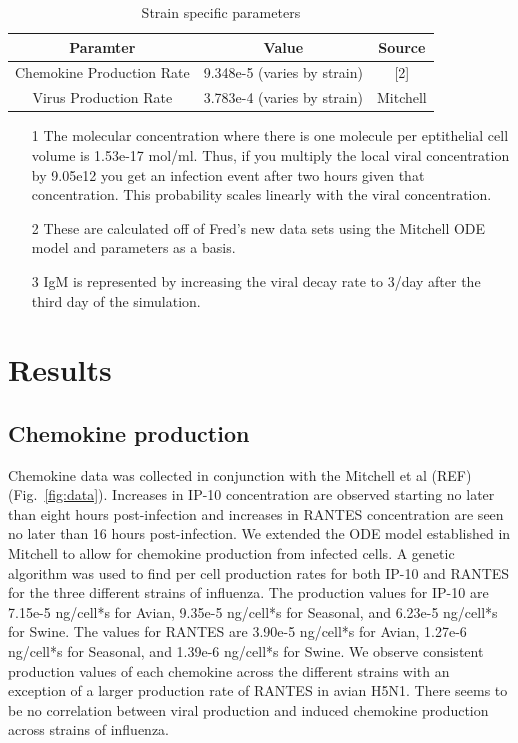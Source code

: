 \documentclass[10pt]{article}
\begin{document}
\begin{table}
\begin{tabular}{ | c | c | c | }
  \hline                        
  Paramter & Value & Source \\
  \hline
  Chemokine Production Rate &  9.348e-5 (varies by strain) & [2] \\
  Virus Production Rate &  3.783e-4 (varies by strain) & Mitchell \\
  \hline  
\end{tabular}
\caption{Strain specific parameters}
\label{table:strains}
\end{table}

\begin{itemize}
\item[1] The molecular concentration where there is one molecule per eptithelial cell volume is 1.53e-17 mol/ml.  Thus, if you multiply the local viral concentration by 9.05e12 you get an infection event after two hours given that concentration.  This probability scales linearly with the viral concentration.
\item[2] These are calculated off of Fred's new data sets using the Mitchell ODE model and parameters as a basis.
\item[3] IgM is represented by increasing the viral decay rate to 3/day after the third day of the simulation.
\end{itemize}


\section*{Results}

\subsection*{Chemokine production}

Chemokine data was collected in conjunction with the Mitchell et al (REF) (Fig.~\ref{fig:data}).   Increases in IP-10 concentration are observed starting no later than eight hours post-infection and increases in RANTES concentration are seen no later than 16 hours post-infection.  We extended the ODE model established in Mitchell to allow for chemokine production from infected cells.  A genetic algorithm was used to find per cell production rates for both IP-10 and RANTES for the three different strains of influenza.  The production values for IP-10 are 7.15e-5 ng/cell*s for Avian, 9.35e-5 ng/cell*s for Seasonal, and 6.23e-5 ng/cell*s for Swine.  The values for RANTES are 3.90e-5 ng/cell*s for Avian, 1.27e-6 ng/cell*s for Seasonal, and 1.39e-6 ng/cell*s for Swine.  We observe consistent production values of each chemokine across the different strains with an exception of a larger production rate of RANTES in avian H5N1.  There seems to be no correlation between viral production and induced chemokine production across strains of influenza.
\end{document}
